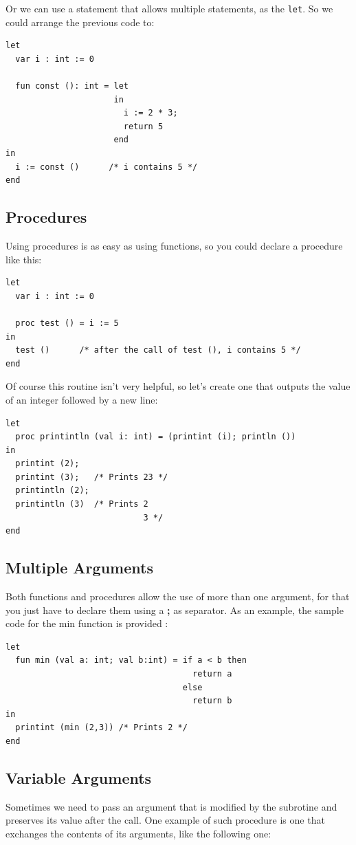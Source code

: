 \documentclass[a4paper, 11pt]{report}
\newcommand{\keyword}[1]{\texttt{#1}}
\begin{document}
Or we can use a statement that allows multiple statements, as the \keyword{let}. So
we could arrange the previous code to:

\begin{verbatim}
let
  var i : int := 0

  fun const (): int = let
                      in
                        i := 2 * 3;
                        return 5
                      end
in
  i := const ()      /* i contains 5 */
end
\end{verbatim}

\subsection{Procedures}

Using procedures is as easy as using functions, so you could declare a procedure like this:


\begin{verbatim}
let
  var i : int := 0

  proc test () = i := 5
in
  test ()      /* after the call of test (), i contains 5 */
end
\end{verbatim}

Of course this routine isn't very helpful, so let's create one that outputs the value of
an integer followed by a new line:

\begin{verbatim}
let
  proc printintln (val i: int) = (printint (i); println ())
in
  printint (2);
  printint (3);   /* Prints 23 */
  printintln (2);
  printintln (3)  /* Prints 2
                            3 */
end
\end{verbatim}

\subsection{Multiple Arguments}
Both functions and procedures allow the use of more than one argument,
for that you just have to declare them using a \textbf{;} as separator. As
an example, the sample code for the min function is provided :

\begin{verbatim}
let
  fun min (val a: int; val b:int) = if a < b then
                                      return a
                                    else
                                      return b
in
  printint (min (2,3)) /* Prints 2 */
end
\end{verbatim}

\subsection{Variable Arguments}
Sometimes we need to pass an argument that is modified by the subrotine and
preserves its value after the call. One example of such procedure is one that
exchanges the contents of its arguments, like the following one:
\end{document}
